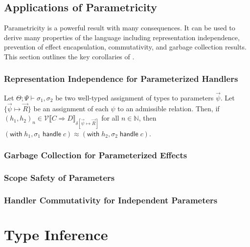 \documentclass[acmsmall,screen,review,anonymous]{acmart}
\newcommand{\thandler}[2]{#1 \Rightarrow #2}
\newcommand{\with}{\mathsf{with}\;}
\newcommand{\handle}{\;\mathsf{handle}\;}
\newcommand{\tj}[3]{#1; #2 \vdash #3}
\newcommand{\VV}{\mathcal{V}}
\begin{document}
\subsection{Applications of Parametricity}

Parametricity is a powerful result with many consequences.
It can be used to derive many properties of the language including
representation independence, prevention of effect encapsulation, commutativity, and garbage collection results.
This section outlines the key corollaries of .

\subsubsection{Representation Independence for Parameterized Handlers}

\begin{theorem}
  Let $\tj \Theta \Psi \sigma_1, \sigma_2$ be two well-typed assignment of types to parameters $\vec\psi$.
  Let $\{\vec\psi \mapsto \vec R\}$ be an assignment of each $\psi$ to an admissible relation.
  Then, if $(h_1, h_2)_n \in \VV\llbracket \thandler{C}{D} \rrbracket_{\delta[\vec\psi \mapsto \vec R]}$ for all $n \in \mathbb{N}$,
  then $(\with h_1, \sigma_1 \handle c) \approx (\with h_2, \sigma_2 \handle c)$.
\end{theorem}

\subsubsection{Garbage Collection for Parameterized Effects}

\subsubsection{Scope Safety of Parameters}

\subsubsection{Handler Commutativity for Independent Parameters}

\section{Type Inference}\label{sec:inference}
\end{document}

